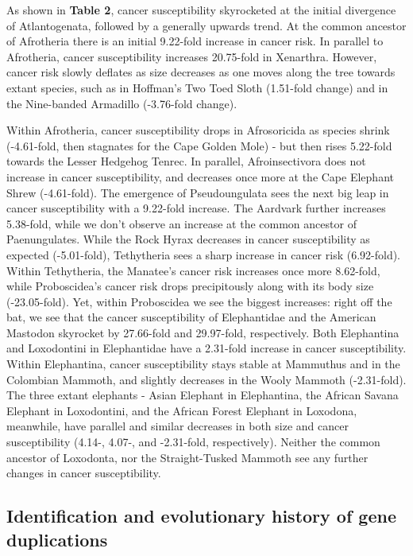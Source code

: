 \documentclass[]{elsarticle} %
\begin{document}
As shown in \textbf{Table 2}, cancer susceptibility skyrocketed at the
initial divergence of Atlantogenata, followed by a generally upwards
trend. At the common ancestor of Afrotheria there is an initial
9.22-fold increase in cancer risk. In parallel to Afrotheria, cancer
susceptibility increases 20.75-fold in Xenarthra. However, cancer risk
slowly deflates as size decreases as one moves along the tree towards
extant species, such as in Hoffman's Two Toed Sloth (1.51-fold change)
and in the Nine-banded Armadillo (-3.76-fold change).

Within Afrotheria, cancer susceptibility drops in Afrosoricida as
species shrink (-4.61-fold, then stagnates for the Cape Golden Mole) -
but then rises 5.22-fold towards the Lesser Hedgehog Tenrec. In
parallel, Afroinsectivora does not increase in cancer susceptibility,
and decreases once more at the Cape Elephant Shrew (-4.61-fold). The
emergence of Pseudoungulata sees the next big leap in cancer
susceptibility with a 9.22-fold increase. The Aardvark further increases
5.38-fold, while we don't observe an increase at the common ancestor of
Paenungulates. While the Rock Hyrax decreases in cancer susceptibility
as expected (-5.01-fold), Tethytheria sees a sharp increase in cancer
risk (6.92-fold). Within Tethytheria, the Manatee's cancer risk
increases once more 8.62-fold, while Proboscidea's cancer risk drops
precipitously along with its body size (-23.05-fold). Yet, within
Proboscidea we see the biggest increases: right off the bat, we see that
the cancer susceptibility of Elephantidae and the American Mastodon
skyrocket by 27.66-fold and 29.97-fold, respectively. Both Elephantina
and Loxodontini in Elephantidae have a 2.31-fold increase in cancer
susceptibility. Within Elephantina, cancer susceptibility stays stable
at Mammuthus and in the Colombian Mammoth, and slightly decreases in the
Wooly Mammoth (-2.31-fold). The three extant elephants - Asian Elephant
in Elephantina, the African Savana Elephant in Loxodontini, and the
African Forest Elephant in Loxodona, meanwhile, have parallel and
similar decreases in both size and cancer susceptibility (4.14-, 4.07-,
and -2.31-fold, respectively). Neither the common ancestor of Loxodonta,
nor the Straight-Tusked Mammoth see any further changes in cancer
susceptibility.

\hypertarget{identification-and-evolutionary-history-of-gene-duplications}{%
\subsection{Identification and evolutionary history of gene
duplications}\label{identification-and-evolutionary-history-of-gene-duplications}}
\end{document}
